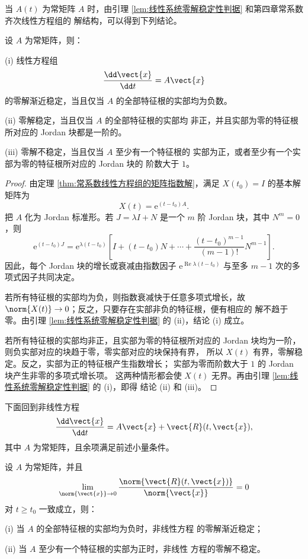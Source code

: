 当 $A(t)$ 为常矩阵 $A$ 时，由引理
\ref{lem:线性系统零解稳定性判据} 和第四章常系数齐次线性方程组的
解结构，可以得到下列结论。

\begin{theorem}\label{thm:常系数线性系统零解稳定性判据}
	设 $A$ 为常矩阵，则：

	\textnormal{(i)} 线性方程组
	\[
		\dfrac{\dd\vect{x}}{\dd t}=A\vect{x}
	\]
	的零解渐近稳定，当且仅当 $A$ 的全部特征根的实部均为负数。

	\textnormal{(ii)} 零解稳定，当且仅当 $A$ 的全部特征根的实部均
	非正，并且实部为零的特征根所对应的 Jordan 块都是一阶的。

	\textnormal{(iii)} 零解不稳定，当且仅当 $A$ 至少有一个特征根的
	实部为正，或者至少有一个实部为零的特征根所对应的 Jordan 块的
	阶数大于 $1$。
\end{theorem}

\begin{proof}
	由定理 \ref{thm:常系数线性方程组的矩阵指数解}，满足
	$X(t_0)=I$ 的基本解矩阵为
	\[
		X(t)=\mathrm{e}^{(t-t_0)A}.
	\]
	把 $A$ 化为 Jordan 标准形。若
	$J=\lambda I+N$ 是一个 $m$ 阶 Jordan 块，其中
	$N^m=0$，则
	\[
		\mathrm{e}^{(t-t_0)J}
		=\mathrm{e}^{\lambda(t-t_0)}
		\left[
		I+(t-t_0)N+\cdots+
		\dfrac{(t-t_0)^{m-1}}{(m-1)!}N^{m-1}
		\right].
	\]
	因此，每个 Jordan 块的增长或衰减由指数因子
	$\mathrm{e}^{\operatorname{Re}\lambda(t-t_0)}$ 与至多
	$m-1$ 次的多项式因子共同决定。

	若所有特征根的实部均为负，则指数衰减快于任意多项式增长，故
	$\norm{X(t)}\to0$；反之，只要存在实部非负的特征根，便有相应的
	解不趋于零。由引理 \ref{lem:线性系统零解稳定性判据} 的
	\textnormal{(ii)}，结论 \textnormal{(i)} 成立。

	若所有特征根的实部均非正，且实部为零的特征根所对应的 Jordan
	块均为一阶，则负实部对应的块趋于零，零实部对应的块保持有界，
	所以 $X(t)$ 有界，零解稳定。反之，实部为正的特征根产生指数增长；
	实部为零而阶数大于 $1$ 的 Jordan 块产生非零的多项式增长项。
	这两种情形都会使 $X(t)$ 无界。再由引理
	\ref{lem:线性系统零解稳定性判据} 的 \textnormal{(i)}，即得
	结论 \textnormal{(ii)} 和 \textnormal{(iii)}。
\end{proof}

下面回到非线性方程
\[
	\dfrac{\dd\vect{x}}{\dd t}
	=A\vect{x}+\vect{R}(t,\vect{x}),
\]
其中 $A$ 为常矩阵，且余项满足前述小量条件。

\begin{theorem}\label{thm:线性近似决定非线性系统稳定性}
	设 $A$ 为常矩阵，并且
	\[
		\lim_{\norm{\vect{x}}\to0}
		\dfrac{\norm{\vect{R}(t,\vect{x})}}
		{\norm{\vect{x}}}=0
	\]
	对 $t\geq t_0$ 一致成立，则：

	\textnormal{(i)} 当 $A$ 的全部特征根的实部均为负时，非线性方程
	的零解渐近稳定；

	\textnormal{(ii)} 当 $A$ 至少有一个特征根的实部为正时，非线性
	方程的零解不稳定。
\end{theorem}

